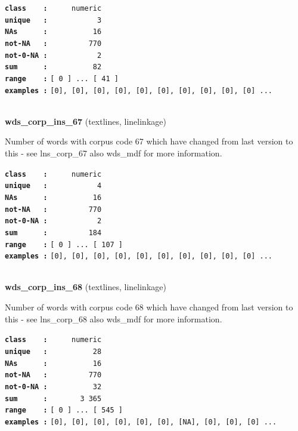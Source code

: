 \documentclass[]{article}
\begin{document}
\textbf{\texttt{class\ \ \ \ :}} \texttt{~~~~~numeric}\\
\textbf{\texttt{unique\ \ \ :}} \texttt{~~~~~~~~~~~3}\\
\textbf{\texttt{NAs\ \ \ \ \ \ :}} \texttt{~~~~~~~~~~16}\\
\textbf{\texttt{not-NA\ \ \ :}} \texttt{~~~~~~~~~770}\\
\textbf{\texttt{not-0-NA\ :}} \texttt{~~~~~~~~~~~2}\\
\textbf{\texttt{sum\ \ \ \ \ \ :}} \texttt{~~~~~~~~~~82}\\
\textbf{\texttt{range\ \ \ \ :}}
\texttt{{[}\ 0\ {]}\ ...\ {[}\ 41\ {]}}\\
\textbf{\texttt{examples\ :}}
\texttt{{[}0{]},\ {[}0{]},\ {[}0{]},\ {[}0{]},\ {[}0{]},\ {[}0{]},\ {[}0{]},\ {[}0{]},\ {[}0{]},\ {[}0{]}\ ...}\\

~

\textbf{wds\_corp\_ins\_67} (textlines, linelinkage)

Number of words with corpus code 67 which have changed from last version
to this - see lns\_corp\_67 also wds\_mdf for more information.

\textbf{\texttt{class\ \ \ \ :}} \texttt{~~~~~numeric}\\
\textbf{\texttt{unique\ \ \ :}} \texttt{~~~~~~~~~~~4}\\
\textbf{\texttt{NAs\ \ \ \ \ \ :}} \texttt{~~~~~~~~~~16}\\
\textbf{\texttt{not-NA\ \ \ :}} \texttt{~~~~~~~~~770}\\
\textbf{\texttt{not-0-NA\ :}} \texttt{~~~~~~~~~~~2}\\
\textbf{\texttt{sum\ \ \ \ \ \ :}} \texttt{~~~~~~~~~184}\\
\textbf{\texttt{range\ \ \ \ :}}
\texttt{{[}\ 0\ {]}\ ...\ {[}\ 107\ {]}}\\
\textbf{\texttt{examples\ :}}
\texttt{{[}0{]},\ {[}0{]},\ {[}0{]},\ {[}0{]},\ {[}0{]},\ {[}0{]},\ {[}0{]},\ {[}0{]},\ {[}0{]},\ {[}0{]}\ ...}\\

~

\textbf{wds\_corp\_ins\_68} (textlines, linelinkage)

Number of words with corpus code 68 which have changed from last version
to this - see lns\_corp\_68 also wds\_mdf for more information.

\textbf{\texttt{class\ \ \ \ :}} \texttt{~~~~~numeric}\\
\textbf{\texttt{unique\ \ \ :}} \texttt{~~~~~~~~~~28}\\
\textbf{\texttt{NAs\ \ \ \ \ \ :}} \texttt{~~~~~~~~~~16}\\
\textbf{\texttt{not-NA\ \ \ :}} \texttt{~~~~~~~~~770}\\
\textbf{\texttt{not-0-NA\ :}} \texttt{~~~~~~~~~~32}\\
\textbf{\texttt{sum\ \ \ \ \ \ :}} \texttt{~~~~~~~3~365}\\
\textbf{\texttt{range\ \ \ \ :}}
\texttt{{[}\ 0\ {]}\ ...\ {[}\ 545\ {]}}\\
\textbf{\texttt{examples\ :}}
\texttt{{[}0{]},\ {[}0{]},\ {[}0{]},\ {[}0{]},\ {[}0{]},\ {[}0{]},\ {[}NA{]},\ {[}0{]},\ {[}0{]},\ {[}0{]}\ ...}\\
\end{document}
